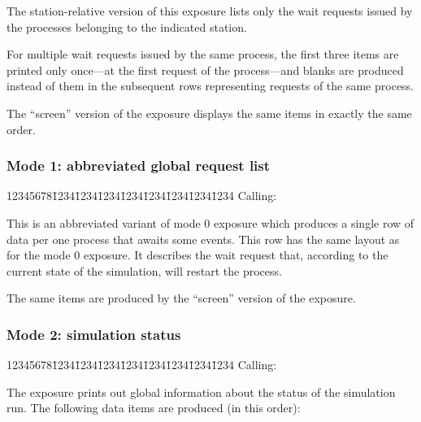 The station-relative version of this exposure lists only the wait requests
issued by the processes belonging to the indicated station.

For multiple wait requests issued by the same process, the first three
items are printed only once---at the first request of the process---and
blanks are produced instead of them in the subsequent rows representing
requests of the same process.

The ``screen'' version of the exposure displays the same items in exactly
the same order.

\subsubsection*{Mode 1: abbreviated global request list}

{\tt\begin{tabbing}
12345678\=1234\=1234\=1234\=1234\=1234\=1234\=1234\=1234\kill
{\rm Calling:}
\end{tabbing}}

This is an abbreviated variant of mode 0 exposure which produces a single
row of data per one process that awaits some events.
This row has the same layout as for the mode 0 exposure.
It describes the wait request that, according to the current state of
the simulation, will restart the process.

The same items are produced by the ``screen'' version of the exposure.

\subsubsection*{Mode 2: simulation status}

{\tt\begin{tabbing}
12345678\=1234\=1234\=1234\=1234\=1234\=1234\=1234\=1234\kill
{\rm Calling:}
\end{tabbing}}

The exposure prints out global information about the status of the
simulation run.
The following data items are produced (in this order):

